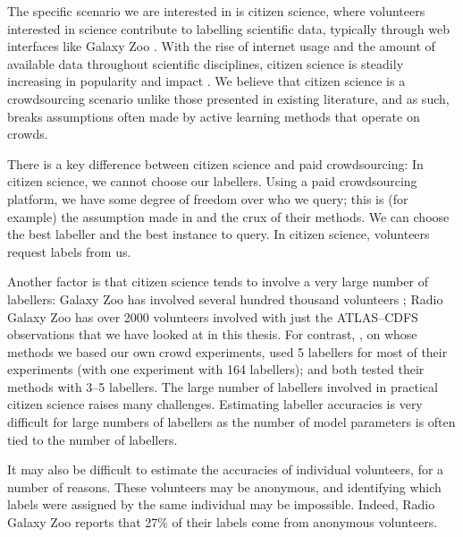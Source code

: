     The specific scenario we are interested in is citizen science, where
    volunteers interested in science contribute to labelling scientific data,
    typically through web interfaces like Galaxy Zoo \citep{lintott11}. With the
    rise of internet usage and the amount of available data throughout
    scientific disciplines, citizen science is steadily increasing in popularity
    and impact \citep{marshall15}. We believe that citizen science is a
    crowdsourcing scenario unlike those presented in existing literature, and as
    such, breaks assumptions often made by active learning methods that operate
    on crowds.

    There is a key difference between citizen science and paid crowdsourcing: In
    citizen science, we cannot choose our labellers. Using a paid crowdsourcing
    platform, we have some degree of freedom over who we query; this is (for
    example) the assumption made in \citet{yan11} and the crux of their methods.
    We can choose the best labeller and the best instance to query. In citizen
    science, volunteers request labels from us.

    Another factor is that citizen science tends to involve a very large number
    of labellers: Galaxy Zoo has involved several hundred thousand volunteers
    \citep{marshall15}; Radio Galaxy Zoo has over 2000 volunteers involved with
    just the ATLAS--CDFS observations that we have looked at in this thesis. For
    contrast, \citet{raykar10}, on whose methods we based our own crowd
    experiments, used 5 labellers for most of their experiments (with one
    experiment with 164 labellers); \citet{mozafari12} and \citet{yan11} both
    tested their methods with 3--5 labellers. The large number of labellers
    involved in practical citizen science raises many challenges. Estimating
    labeller accuracies is very difficult for large numbers of labellers as the
    number of model parameters is often tied to the number of labellers.

    It may also be difficult to estimate the accuracies of individual
    volunteers, for a number of reasons. These volunteers may be anonymous, and
    identifying which labels were assigned by the same individual may be
    impossible. Indeed, Radio Galaxy Zoo reports that 27\% of their labels come
    from anonymous volunteers.

